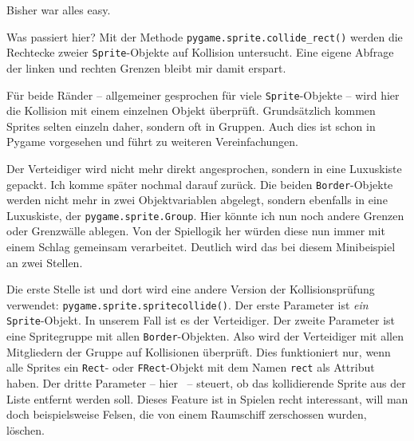 Bisher war alles easy. 


Was passiert hier? Mit der Methode \texttt{pygame.sprite.collide\_rect()} werden die Rechtecke zweier \texttt{Sprite}-Objekte auf Kollision untersucht. Eine eigene Abfrage der linken und rechten Grenzen bleibt mir damit erspart.

Für beide Ränder -- allgemeiner gesprochen für viele \texttt{Sprite}-Objekte -- wird hier die Kollision mit einem einzelnen Objekt überprüft. Grundsätzlich kommen Sprites selten einzeln daher, sondern oft in Gruppen. Auch dies ist schon in Pygame vorgesehen und führt zu weiteren Vereinfachungen.


Der Verteidiger wird nicht mehr direkt angesprochen, sondern in eine Luxuskiste gepackt. Ich komme später nochmal darauf zurück. Die beiden \texttt{Border}-Objekte werden nicht mehr in zwei Objektvariablen abgelegt, sondern ebenfalls in eine Luxuskiste, der \texttt{pygame.sprite.Group}. Hier könnte ich nun noch andere Grenzen oder Grenzwälle ablegen. Von der Spiellogik her würden diese nun immer mit einem Schlag gemeinsam verarbeitet. Deutlich wird das bei diesem Minibeispiel an zwei Stellen.

Die erste Stelle ist  und dort wird eine andere Version der Kollisionsprüfung verwendet: \texttt{pygame.sprite.\-sprite\-collide()}. Der erste Parameter ist \emph{ein} \texttt{Sprite}-Objekt. In unserem Fall ist es der Verteidiger. Der zweite Parameter ist eine Spritegruppe mit allen \texttt{Border}-Objekten. Also wird der Verteidiger mit allen Mitgliedern der Gruppe auf Kollisionen überprüft. Dies funktioniert nur, wenn alle Sprites ein \texttt{Rect}- oder \texttt{FRect}-Objekt mit dem Namen \texttt{rect} als Attribut haben. Der dritte Parameter -- hier \false\ -- steuert, ob das kollidierende Sprite aus der Liste entfernt werden soll. Dieses Feature ist in Spielen recht interessant, will man doch beispielsweise Felsen, die von einem Raumschiff zerschossen wurden, löschen.

